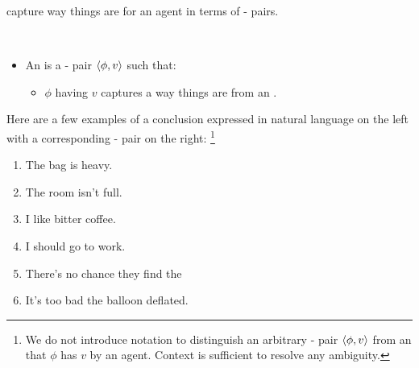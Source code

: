 \begin{note}
   capture way things are for an agent in terms of - pairs.

    \begin{definition}[\evalN{3}]
      \label{def:evals}
      \mbox{ }
      \vspace{-\baselineskip}
      \begin{itemize}
      \item
        An \emph{\evalN{}} is a - pair \(\langle\phi, v\rangle\) such that:
        \begin{itemize}
        \item
          \(\phi\) having  \(v\) captures a way things are from an \agpe{}.
        \end{itemize}
      \end{itemize}
      \vspace{-\baselineskip}
    \end{definition}

    \noindent%
    Here are a few examples of a conclusion expressed in natural language on the left with a corresponding - pair on the right:%
    \footnote{
      We do not introduce notation to distinguish an arbitrary - pair \(\langle\phi, v\rangle\) from an \eval{} that \(\phi\) has  \(v\) by an agent.
      Context is sufficient to resolve any ambiguity.
    }

    \begin{enumerate}[label=\arabic*., ref=(\arabic*), noitemsep, series=propValExC]
    \item
      The bag is heavy.%
      \hfill%
    \item
      The room isn't full.%
      \hfill%
    \item
      \label{pvEx:bC}
      I like bitter coffee.%
      \hfill%
    \item
      I should go to work.%
      \hfill%
    \item
      There's no chance they find the%
      \hfill%
    \item
      It's too bad the balloon deflated.%
      \hfill%
    \end{enumerate}


\end{note}
